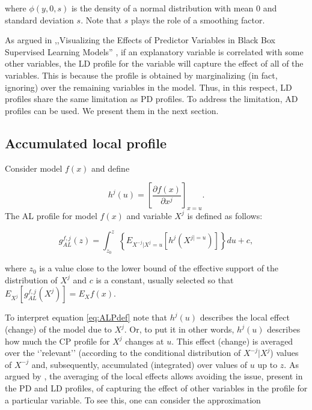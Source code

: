 \documentclass[]{krantz}
\begin{document}
where \(\phi(y,0,s)\) is the density of a normal distribution with mean 0 and standard deviation \(s\). Note that \(s\) plays the role of a smoothing factor.

As argued in ,,Visualizing the Effects of Predictor Variables in Black Box Supervised Learning Models'' \citep{ALEPlot2}, if an explanatory variable is correlated with some other variables, the LD profile for the variable will capture the effect of all of the variables. This is because the profile is obtained by marginalizing (in fact, ignoring) over the remaining variables in the model. Thus, in this respect, LD profiles share the same limitation as PD profiles. To address the limitation, AD profiles can be used. We present them in the next section.

\hypertarget{accumulated-local-profile}{%
\subsection{Accumulated local profile}\label{accumulated-local-profile}}

Consider model \(f(x)\) and define

\[
h^j(u)=\left[ \frac{\partial f(x)}{\partial x^j} \right]_{x=u}.
\]
The AL profile for model \(f(x)\) and variable \(X^j\) is defined as follows:

\begin{equation}
g_{AL}^{f, j}(z) = \int_{z_0}^z \left\{E_{X^{-j}|X^j=u}\left[ h^j(X^{j|=u}) \right]\right\} du + c,
\label{eq:ALPdef}
\end{equation}

where \(z_0\) is a value close to the lower bound of the effective support of the distribution of \(X^j\) and \(c\) is a constant, usually selected so that \(E_{X^j}\left[g_{AL}^{f,j}(X^j)\right] = E_X f(x)\).

To interpret equation \eqref{eq:ALPdef} note that \(h^j(u)\) describes the local effect (change) of the model due to \(X^j\). Or, to put it in other words, \(h^j(u)\) describes how much the CP profile for \(X^j\) changes at \(u\). This effect (change) is averaged over the `'relevant'' (according to the conditional distribution of \(X^{-j}|X^j\)) values of \(X^{-j}\) and, subsequently, accumulated (integrated) over values of \(u\) up to \(z\). As argued by \citep{ALEPlot2}, the averaging of the local effects allows avoiding the issue, present in the PD and LD profiles, of capturing the effect of other variables in the profile for a particular variable. To see this, one can consider the approximation
\end{document}
